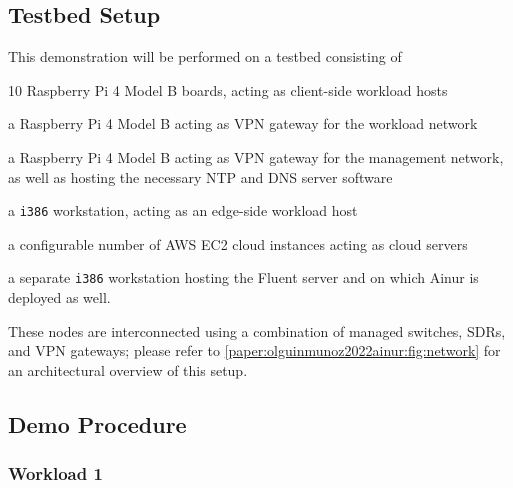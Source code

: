 \subsection{Testbed Setup}

This demonstration will be performed on a testbed consisting of
\begin{inlineenum}[itemjoin={{; }}, itemjoin*={{; and finally }}]
    \item \num{10} Raspberry Pi 4 Model B boards, acting as client-side workload hosts
    \item a Raspberry Pi 4 Model B acting as \gls{VPN} gateway for the workload network
    \item a Raspberry Pi 4 Model B acting as \gls{VPN} gateway for the management network, as well as hosting the necessary \gls{NTP} and \gls{DNS} server software
    \item a \texttt{i386} workstation, acting as an edge-side workload host
    \item a configurable number of  \gls{AWS} \gls{EC2} cloud instances acting as cloud servers
    \item a separate \texttt{i386} workstation hosting the Fluent server and on which Ainur is deployed as well.
\end{inlineenum}
These nodes are interconnected using a combination of managed switches, \glspl{SDR}, and \gls{VPN} gateways; please refer to \cref{paper:olguinmunoz2022ainur:fig:network} for an architectural overview of this setup.


\subsection{Demo Procedure}

\subsubsection{Workload 1}


